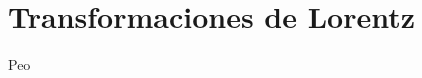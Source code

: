 \documentclass[../main.tex]{subfiles}
\begin{document}
\section{Transformaciones de Lorentz}
Peo
\end{document}

